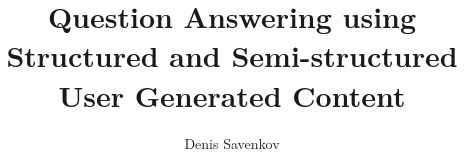 \documentclass{sig-alternate}
\begin{document}
%

\title{Question Answering using Structured and Semi-structured User Generated Content}
%
%
%
%
%

%
\author{
\alignauthor
Denis Savenkov\\
       \\
       \\
}
\end{document}
